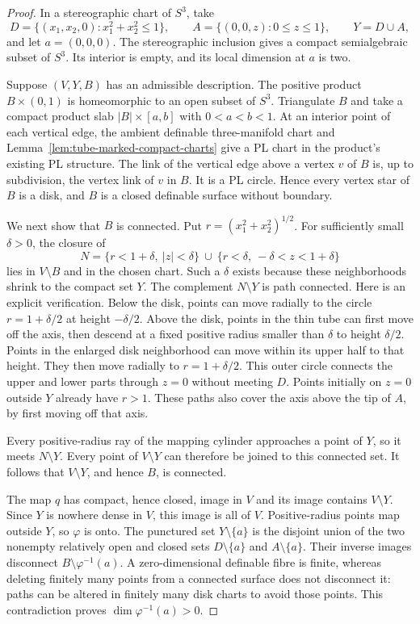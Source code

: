 \begin{proof}
In a stereographic chart of $S^3$, take
\[
 D=\{(x_1,x_2,0):x_1^2+x_2^2\leq1\},\qquad
 A=\{(0,0,z):0\leq z\leq1\},\qquad Y=D\cup A,
\]
and let $a=(0,0,0)$.  The stereographic inclusion gives a compact
semialgebraic subset of $S^3$.  Its interior is empty, and its local
dimension at $a$ is two.

Suppose $(V,Y,B)$ has an admissible description.  The positive product $B\times(0,1)$ is homeomorphic to an open
subset of $S^3$. Triangulate $B$ and take a compact product slab
$|B|\times[a,b]$ with $0<a<b<1$. At an interior point of each
vertical edge, the ambient definable three-manifold chart and
Lemma~\ref{lem:tube-marked-compact-charts} give a PL chart in
the product's existing PL structure. The link of the vertical
edge above a vertex $v$ of $B$ is, up to subdivision, the vertex
link of $v$ in $B$. It is a PL circle. Hence every vertex star
of $B$ is a disk, and $B$ is a closed definable surface without
boundary.

We next show that $B$ is connected.  Put
$r=(x_1^2+x_2^2)^{1/2}$.  For sufficiently small $\delta>0$, the
closure of
\[
 N=\{r<1+\delta,\ |z|<\delta\}
   \ \cup\ \{r<\delta,\ -\delta<z<1+\delta\}
\]
lies in $V\setminus B$ and in the chosen chart.  Such a $\delta$
exists because these neighborhoods shrink to the compact set $Y$.
The complement $N\setminus Y$ is path connected.  Here is an
explicit verification.  Below the disk, points can move radially
to the circle $r=1+\delta/2$ at height $-\delta/2$.  Above the disk,
points in the thin tube can first move off the axis, then descend
at a fixed positive radius smaller than $\delta$ to height
$\delta/2$.  Points in the enlarged disk neighborhood can move
within its upper half to that height.  They then move radially to
$r=1+\delta/2$.  This outer circle connects the upper and lower
parts through $z=0$ without meeting $D$.  Points initially on
$z=0$ outside $Y$ already have $r>1$.  These paths also cover the
axis above the tip of $A$, by first moving off that axis.

Every positive-radius ray of the mapping cylinder approaches a
point of $Y$, so it meets $N\setminus Y$.  Every point of
$V\setminus Y$ can therefore be joined to this connected set.
It follows that $V\setminus Y$, and hence $B$, is connected.

The map $q$ has compact, hence closed, image in $V$ and its image
contains $V\setminus Y$.  Since $Y$ is nowhere dense in $V$, this
image is all of $V$.  Positive-radius points map outside $Y$, so
$\varphi$ is onto.  The punctured set $Y\setminus\{a\}$ is the
disjoint union of the two nonempty relatively open and closed sets
$D\setminus\{a\}$ and $A\setminus\{a\}$.  Their inverse images
disconnect $B\setminus\varphi^{-1}(a)$.  A zero-dimensional
definable fibre is finite, whereas deleting finitely many points
from a connected surface does not disconnect it: paths can be
altered in finitely many disk charts to avoid those points.  This
contradiction proves $\dim\varphi^{-1}(a)>0$.


\end{proof}
